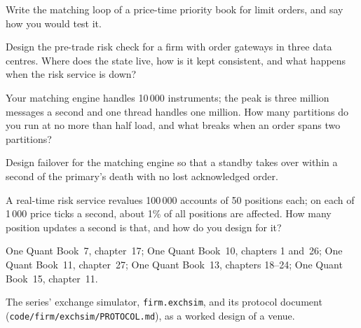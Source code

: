 \begin{interviewq}\label{iq:iv:system-design:9}
Write the matching loop of a price-time priority book for limit orders, and say how you would test it.
\end{interviewq}

\begin{interviewq}\label{iq:iv:system-design:10}
Design the pre-trade risk check for a firm with order gateways in three data centres. Where does the state live, how is it kept
consistent, and what happens when the risk service is down?
\end{interviewq}

\begin{interviewq}\label{iq:iv:system-design:11}
Your matching engine handles 10\,000 instruments; the peak is three million messages a second and one thread handles one million.
How many partitions do you run at no more than half load, and what breaks when an order spans two partitions?
\end{interviewq}

\begin{interviewq}\label{iq:iv:system-design:12}
Design failover for the matching engine so that a standby takes over within a second of the primary's death with no lost
acknowledged order.
\end{interviewq}

\begin{interviewq}\label{iq:iv:system-design:13}
A real-time risk service revalues 100\,000 accounts of 50 positions each; on each of 1\,000 price ticks a second, about 1\% of all
positions are affected. How many position updates a second is that, and how do you design for it?
\end{interviewq}

\begin{omsources}
\item One Quant Book~7, chapter~17; One Quant Book~10, chapters 1 and~26; One Quant Book~11, chapter~27; One Quant Book~13, chapters
18--24; One Quant Book~15, chapter~11.
\item The series' exchange simulator, \texttt{firm.exchsim}, and its protocol document (\texttt{code/firm/exchsim/PROTOCOL.md}), as a
worked design of a venue.
\end{omsources}
